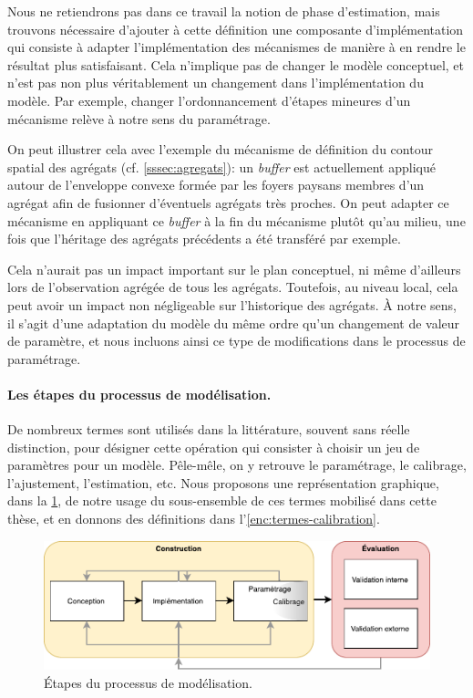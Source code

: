 Nous ne retiendrons pas dans ce travail la notion de phase d'estimation, mais trouvons nécessaire d'ajouter à cette définition une composante d'implémentation qui consiste à adapter l'implémentation des mécanismes de manière à en rendre le résultat plus satisfaisant.
Cela n'implique pas de changer le modèle conceptuel, et n'est pas non plus véritablement un changement dans l'implémentation du modèle.
Par exemple, changer l'ordonnancement d'étapes mineures d'un mécanisme relève à notre sens du paramétrage.

On peut illustrer cela avec l'exemple du mécanisme de définition du contour spatial des agrégats (cf. \cref{sssec:agregats}): un \textit{buffer} est actuellement appliqué autour de l'enveloppe convexe formée par les foyers paysans membres d'un agrégat afin de fusionner d'éventuels agrégats très proches.
On peut adapter ce mécanisme en appliquant ce \textit{buffer} à la fin du mécanisme plutôt qu'au milieu, une fois que l'héritage des agrégats précédents a été transféré par exemple.

Cela n'aurait pas un impact important sur le plan conceptuel, ni même d'ailleurs lors de l'observation agrégée de tous les agrégats.
Toutefois, au niveau local, cela peut avoir un impact non négligeable sur l'historique des agrégats.
À notre sens, il s'agit d'une adaptation du modèle du même ordre qu'un changement de valeur de paramètre, et nous incluons ainsi ce type de modifications dans le processus de paramétrage.


\paragraph{Les étapes du processus de modélisation.}

De nombreux termes sont utilisés dans la littérature, souvent sans réelle distinction, pour désigner cette opération qui consister à choisir un jeu de paramètres pour un modèle.
Pêle-mêle, on y retrouve le paramétrage, le calibrage, l'ajustement, l'estimation, etc.
Nous proposons une représentation graphique, dans la \cref{fig:etapes-modelisation}, de notre usage du sous-ensemble de ces termes mobilisé dans cette thèse, et en donnons des définitions dans l'\cref{enc:termes-calibration}.

\begin{figure}[H]
	\includegraphics[width=1\textwidth]{img/schema_definition_parametrage.pdf}
	\caption{Étapes du processus de modélisation.} 
	\label{fig:etapes-modelisation} 
\end{figure}


